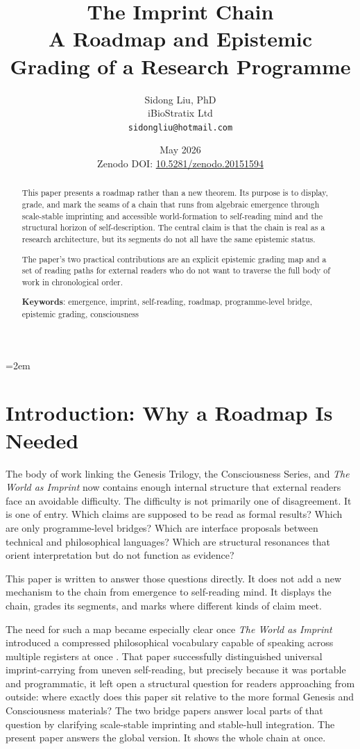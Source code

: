 \documentclass[12pt]{article}
\title{%
  \textbf{The Imprint Chain}\\
  \textbf{A Roadmap and Epistemic Grading of a Research Programme}%
}
\author{
  Sidong Liu, PhD \\
  \small iBioStratix Ltd \\
  \small \texttt{sidongliu@hotmail.com}
}
\date{May 2026\\
\small Zenodo DOI: \href{https://doi.org/10.5281/zenodo.20151594}{10.5281/zenodo.20151594}}
\begin{document}
\emergencystretch=2em
\raggedbottom
{}

\maketitle

\begin{abstract}
This paper presents a roadmap rather than a new theorem. Its purpose is to display, grade, and mark the seams of a chain that runs from algebraic emergence through scale-stable imprinting and accessible world-formation to self-reading mind and the structural horizon of self-description. The central claim is that the chain is real as a research architecture, but its segments do not all have the same epistemic status.

The paper's two practical contributions are an explicit epistemic grading map and a set of reading paths for external readers who do not want to traverse the full body of work in chronological order.

\medskip

\noindent\textbf{Keywords}: emergence, imprint, self-reading, roadmap, programme-level bridge, epistemic grading, consciousness
\end{abstract}

\clearpage
\tableofcontents
\clearpage

\section{Introduction: Why a Roadmap Is Needed}

The body of work linking the Genesis Trilogy, the Consciousness Series, and \emph{The World as Imprint} now contains enough internal structure that external readers face an avoidable difficulty. The difficulty is not primarily one of disagreement. It is one of entry. Which claims are supposed to be read as formal results? Which are only programme-level bridges? Which are interface proposals between technical and philosophical languages? Which are structural resonances that orient interpretation but do not function as evidence?

This paper is written to answer those questions directly. It does not add a new mechanism to the chain from emergence to self-reading mind. It displays the chain, grades its segments, and marks where different kinds of claim meet.

The need for such a map became especially clear once \emph{The World as Imprint} introduced a compressed philosophical vocabulary capable of speaking across multiple registers at once \cite{WorldImprint}. That paper successfully distinguished universal imprint-carrying from uneven self-reading, but precisely because it was portable and programmatic, it left open a structural question for readers approaching from outside: where exactly does this paper sit relative to the more formal Genesis and Consciousness materials? The two bridge papers answer local parts of that question by clarifying scale-stable imprinting and stable-hull integration. The present paper answers the global version. It shows the whole chain at once.
\end{document}
